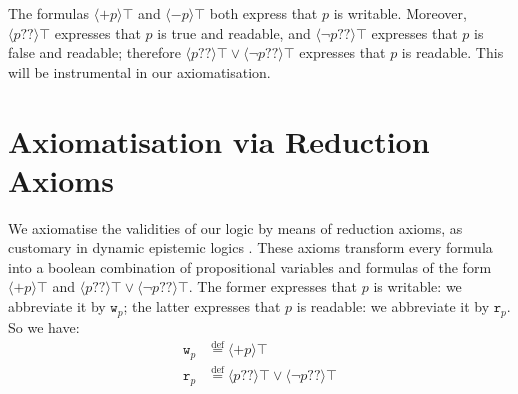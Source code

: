 \documentclass{llncs}
\newcommand{\modl}{\mathsf m}
\newcommand{\readable}[1]{\mathtt{r}_{#1}}
\newcommand{\readset}{\mathsf{Rd}}
\newcommand{\valuset}{\mathsf{V}}
\newcommand{\writable}[1]{\mathtt{w}_{#1}}
\newcommand{\writeset}{\mathsf{Wr}}
\newcommand{\testendo}{?\!\!?}			%
\newcommand{\assgntopV}[1]{{\mathtt {+} #1}}
\newcommand{\assgnbotV}[1]{{\mathtt {-} #1}}
\newcommand{\eqdef}{\stackrel{\text{def}}{=}}
\newcommand{\intPgm}[1]{\llbracket #1 \rrbracket}
\newcommand{\ldia}[1]{ \big\langle #1 \big\rangle}
\newcommand{\ndet}{\,{\cup}\,}
\renewcommand{\phi}{\varphi}
\newcommand{\propset}{\mathbb P}
\newcommand{\propsetOf}[1]{\propset_{#1}}
\begin{document}
%

The formulas $\ldia{ \assgntopV p } \top $ and $\ldia{ \assgnbotV p } \top $ both express that $p$ is writable. 
Moreover, $\ldia{ p \testendo} \top $ expresses that $p$ is true and readable, and 
$\ldia{ \lnot p \testendo} \top $ expresses that $p$ is false and readable;
therefore $\ldia{ p \testendo} \top \lor \ldia{ \lnot p \testendo} \top $ 
expresses that $p$ is readable. 
This will be instrumental in our axiomatisation. 

\section{Axiomatisation via Reduction Axioms}\label{sec:axiomatisation}

We axiomatise the validities of our logic by means of reduction axioms, as customary in dynamic epistemic logics \cite{DitmarschHoekKooi07}. 
These axioms transform every formula into a boolean combination of propositional variables
and formulas of the form
$\ldia{ \assgntopV p } \top $ and 
$\ldia{ p \testendo} \top \lor \ldia{ \lnot p \testendo} \top $. 
The former expresses that $p$ is writable: we abbreviate it by $\writable{p}$;
the latter expresses that $p$ is readable: we abbreviate it by $\readable p$. 
So we have:
\begin{align*}
\writable{p} &\eqdef \ldia{ \assgntopV p } \top 
\\
\readable p &\eqdef \ldia{ p \testendo} \top \lor \ldia{ \lnot p \testendo} \top 
\end{align*}
\end{document}
